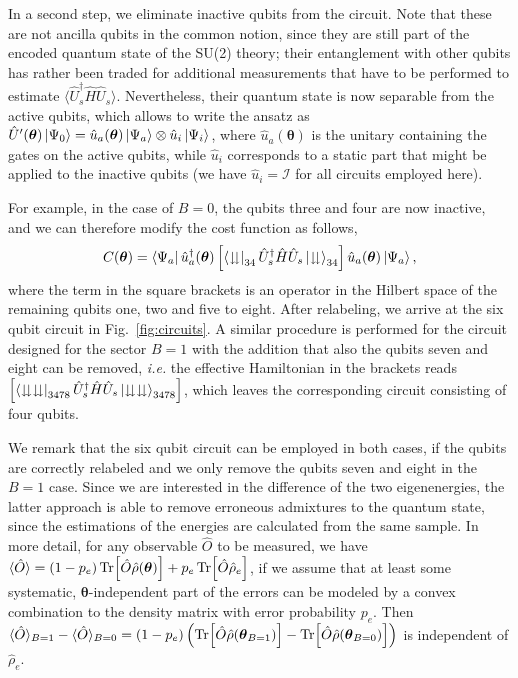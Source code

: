 \documentclass[twocolumn,aps,showpacs,prb,superscriptaddress,floatfix,10pt,nofootinbib]{revtex4-2}
\begin{document}
In a second step, we eliminate inactive qubits from the circuit. 
Note that these are not ancilla qubits in the common notion, since they are still part of the encoded quantum state of the SU(2) theory; their entanglement with other qubits has rather been traded for additional measurements that have to be performed to estimate $\langle \hat{U}_s^\dagger\hat{H} \hat{U}_s\rangle$. Nevertheless, their quantum state is now separable from the active qubits, which allows to write the ansatz as $\hat{U}^\prime(\boldsymbol{\theta})\ket{\Psi_0}=\hat{u}_a(\boldsymbol{\theta})\ket{\Psi_a} \otimes \hat{u}_i \ket{\Psi_i}$, where $\hat{u}_a(\boldsymbol{\theta})$ is the unitary containing the gates on the active qubits, while $\hat{u}_i$ corresponds to a static part that might be applied to the inactive qubits (we have $\hat{u}_i = \mathcal{I}$ for all circuits employed here). 

For example, in the case of $B=0$, the qubits three and four are now inactive, and we can therefore modify the cost function as follows, 
\begin{equation}
C(\boldsymbol{\theta}) = \bra{\Psi_a}\hat{u}_a^\dagger(\boldsymbol{\theta}) \left[\bra{\downdownarrows}_{34}\hat{U}_s^\dagger\hat{H} \hat{U}_s\ket{\downdownarrows}_{34}\right]\hat{u}_a(\boldsymbol{\theta})\ket{\Psi_a},
\end{equation}
where the term in the square brackets is an operator in the Hilbert space of the remaining qubits one, two and five to eight. 
After relabeling, we arrive at the six qubit circuit in Fig.~\ref{fig:circuits}. 
A similar procedure is performed for the circuit designed for the sector $B=1$ with the addition that also the qubits seven and eight can be removed, \textit{i.e.} the effective Hamiltonian in the brackets reads $\left[\bra{\downdownarrows\downdownarrows}_{3478}\hat{U}_s^\dagger\hat{H}\hat{U}_s\ket{\downdownarrows\downdownarrows}_{3478}\right]$, which leaves the corresponding circuit consisting of four qubits.

We remark that the six qubit circuit can be employed in both cases, if the qubits are correctly relabeled and we only remove the qubits seven and eight in the $B=1$ case. 
Since we are interested in the difference of the two eigenenergies, the latter approach is able to remove erroneous admixtures to the quantum state, since the estimations of the energies are calculated from the same sample. In more detail, for any observable $\hat{O}$ to be measured, we have $\langle \hat{O} \rangle = (1-p_e) \Tr[\hat{O} \hat{\rho}(\boldsymbol{\theta})] + p_e \Tr[\hat{O} \hat{\rho}_e]$, if we assume that at least some systematic, $\boldsymbol{\theta}$-independent part of the errors can be modeled by a convex combination to the density matrix with error probability $p_e$. 
Then $\langle \hat{O} \rangle_{B=1} - \langle \hat{O} \rangle_{B=0} = (1-p_e)\left(\Tr[\hat{O} \hat{\rho}(\boldsymbol{\theta}_{B=1})] - \Tr[\hat{O}\hat{\rho}(\boldsymbol{\theta}_{B=0})]\right)$ is independent of $\hat{\rho}_e$.
\end{document}
